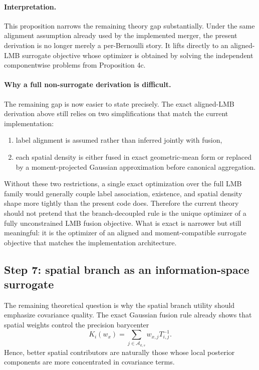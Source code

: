 \paragraph{Interpretation.}
This proposition narrows the remaining theory gap substantially. Under the same alignment assumption already used by the implemented merger, the present derivation is no longer merely a per-Bernoulli story. It lifts directly to an aligned-LMB surrogate objective whose optimizer is obtained by solving the independent componentwise problems from Proposition 4c.

\paragraph{Why a full non-surrogate derivation is difficult.}
The remaining gap is now easier to state precisely. The exact aligned-LMB derivation above still relies on two simplifications that match the current implementation:
\begin{enumerate}
\item label alignment is assumed rather than inferred jointly with fusion,
\item each spatial density is either fused in exact geometric-mean form or replaced by a moment-projected Gaussian approximation before canonical aggregation.
\end{enumerate}
Without these two restrictions, a single exact optimization over the full LMB family would generally couple label association, existence, and spatial density shape more tightly than the present code does. Therefore the current theory should not pretend that the branch-decoupled rule is the unique optimizer of a fully unconstrained LMB fusion objective. What is exact is narrower but still meaningful: it is the optimizer of an aligned and moment-compatible surrogate objective that matches the implementation architecture.

\subsection*{Step 7: spatial branch as an information-space surrogate}

The remaining theoretical question is why the spatial branch utility should emphasize covariance quality. The exact Gaussian fusion rule already shows that spatial weights control the precision barycenter
\begin{equation}
K_i(w_x) = \sum_{j \in \mathcal{A}_{k,s}} w_{x,j} T_{i,j}^{-1}.
\end{equation}
Hence, better spatial contributors are naturally those whose local posterior components are more concentrated in covariance terms.

